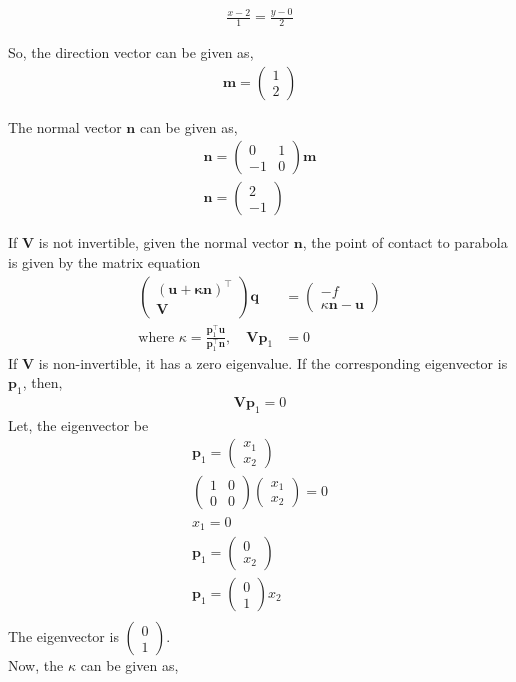 \documentclass[a4paper,10pt]{report}
\newcommand{\myvec}[1]{\ensuremath{\begin{pmatrix}#1\end{pmatrix}}}
\let\vec\mathbf
\begin{document}
\begin{multicols}{2}
\begin{align*}
\frac{x-2}{1}=\frac{y-0}{2}
\end{align*}
\raggedright\large{So, the direction vector can be given as,}
\begin{align*}
\vec{m}=\myvec{1\\2}
\end{align*}
\raggedright{The normal vector $\vec{n}$ can be given as,}
\begin{gather*}
\vec{n}=\myvec{0&1\\-1&0}\vec{m}\\
\vec{n}=\myvec{2\\-1}
\end{gather*}
\raggedright\large{If $\vec{V}$ is not invertible,  given the normal vector $\vec{n}$, the point of contact to parabola is given by the matrix equation}
\begin{align}
\begin{pmatrix}
\vec{(u+\kappa \vec{n})}^{\top} \\ \vec{V}
\end{pmatrix}
\vec{q} &= 
\begin{pmatrix}
-f
\\
\kappa\vec{n}-\vec{u}
\end{pmatrix}
\\
\text{where }  \kappa = \frac{\vec{p}_1^{\top}\vec{u}}{\vec{p}_1^{\top}\vec{n}}, \quad \vec{V}\vec{p}_1 &= 0
\end{align}
If $\vec{V}$ is non-invertible, it has a zero eigenvalue.  If the corresponding eigenvector is $\vec{p}_1$, then,
\begin{gather*}
\vec{V}\vec{p}_1= 0
\end{gather*}
Let, the eigenvector be 
\begin{gather*}
\vec{p}_1=\myvec{{x}_1\\{x}_2}\\
\myvec{1&0\\0&0}\myvec{{x}_1\\{x}_2}=0\\
{x}_1=0\\
\vec{p}_1=\myvec{0\\{x}_2}\\
\vec{p}_1=\myvec{0\\1}{x}_2\\
\end{gather*}
The eigenvector is $\myvec{0\\1}.$\vspace{5mm}\\
Now, the $\kappa$ can be given as,

\end{multicols}
\end{document}
